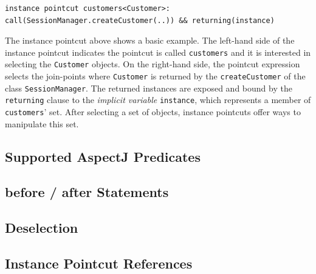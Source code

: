 \documentclass{llncs}
\begin{document}
\begin{lstlisting}[float=h!]
instance pointcut customers<Customer>: call(SessionManager.createCustomer(..)) && returning(instance)
\end{lstlisting}

The instance pointcut above shows a basic example. The left-hand side of the instance pointcut indicates the pointcut is called \texttt{customers} and it is interested in selecting the \texttt{Customer} objects. On the right-hand side, the pointcut expression selects the join-points where \texttt{Customer} is returned by the \texttt{createCustomer} of the class \texttt{SessionManager}. The returned instances are exposed and bound by the \texttt{returning} clause to the \emph{implicit variable} \texttt{instance}, which represents a member of \texttt{customers}' set. After selecting a set of objects, instance pointcuts offer ways to manipulate this set. 




\subsection{Supported AspectJ Predicates}


\subsection{before / after Statements}


\subsection{Deselection}


\subsection{Instance Pointcut References}

\end{document}
